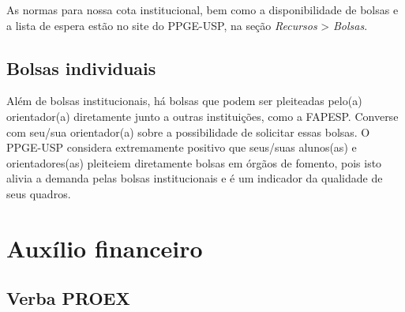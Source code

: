 As normas para nossa cota institucional, bem como a disponibilidade de
bolsas e a lista de espera estão no site do PPGE-USP, na seção
\emph{Recursos} \textgreater{} \emph{Bolsas}.

\subsection{Bolsas individuais}

Além de bolsas institucionais, há bolsas que podem ser pleiteadas
pelo(a) orientador(a) diretamente junto a outras instituições, como a
FAPESP. Converse com seu/sua orientador(a) sobre a possibilidade de
solicitar essas bolsas. O PPGE-USP considera extremamente positivo que
seus/suas alunos(as) e orientadores(as) pleiteiem diretamente bolsas
em órgãos de fomento, pois isto alivia a demanda pelas bolsas
institucionais e é um indicador da qualidade de seus
quadros.




\section{Auxílio financeiro}

\subsection{Verba PROEX}

